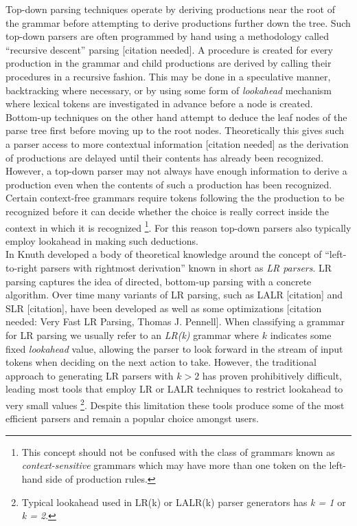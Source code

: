 \documentclass[a4paper,11pt]{article}
\begin{document}
Top-down parsing techniques operate by deriving productions near the root of the grammar before attempting to derive productions further down the tree.
Such top-down parsers are often programmed by hand using a methodology called ``recursive descent'' parsing [citation needed].
A procedure is created for every production in the grammar and child productions are derived by calling their procedures in a recursive fashion.
This may be done in a speculative manner, backtracking where necessary, or by using some form of \emph{lookahead} mechanism where lexical tokens are investigated in advance before a node is created.\\

Bottom-up techniques on the other hand attempt to deduce the leaf nodes of the parse tree first before moving up to the root nodes. 
Theoretically this gives such a parser access to more contextual information [citation needed] as the derivation of productions are delayed until their contents has already been recognized.
However, a top-down parser may not always have enough information to derive a production even when the contents of such a production has been recognized. 
Certain context-free grammars require tokens following the the production to be recognized before it can decide whether the choice is really correct inside the context in which it is recognized
\footnote{This concept should not be confused with the class of grammars known as \emph{context-sensitive} grammars which may have more than one token on the left-hand side of production rules.}.
For this reason top-down parsers also typically employ lookahead in making such deductions.\\

In \cite{knuth65} Knuth developed a body of theoretical knowledge around the concept of ``left-to-right parsers with rightmost derivation'' known in short as \emph{LR parsers}. 
LR parsing captures the idea of directed, bottom-up parsing with a concrete algorithm.
Over time many variants of LR parsing, such as LALR [citation] and SLR [citation], have been developed as well as some optimizations [citation needed: Very Fast LR Parsing, Thomas J. Pennell].
When classifying a grammar for LR parsing we usually refer to an \emph{LR(k)} grammar where $k$ indicates some fixed \emph{lookahead} value, allowing the parser to look forward in the stream of input tokens when deciding on the next action to take.
However, the traditional approach to generating LR parsers with $k > 2$ has proven prohibitively difficult, leading most tools that employ LR or LALR techniques to restrict lookahead to very small values
\footnote{Typical lookahead used in LR(k) or LALR(k) parser generators has \emph{k = 1} or \emph{k = 2}.}.
Despite this limitation these tools produce some of the most efficient parsers and remain a popular choice amongst users.\\
\end{document}
